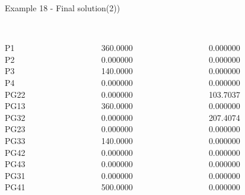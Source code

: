 \begin{frame}{Example 18 - Final solution(2))}

\begin{columns}[t]
\begin{column}{0.3\textwidth}
\\

P1\\
P2\\
P3\\
P4\\
PG22\\
PG13\\
PG32\\
PG23\\
PG33\\
PG42\\
PG43\\
PG31\\
PG41\\
\end{column}
\begin{column}{0.3\textwidth}
\\

360.0000\\
0.000000\\
140.0000\\
0.000000\\
0.000000\\
360.0000\\
0.000000\\
0.000000\\
140.0000\\
0.000000\\
0.000000\\
0.000000\\
500.0000\\
\end{column}  

\begin{column}{0.3\textwidth}
\\
0.000000\\
0.000000\\
0.000000\\
0.000000\\
103.7037\\
0.000000\\
207.4074\\
0.000000\\
0.000000\\
0.000000\\
0.000000\\
0.000000\\
0.000000\\
\end{column}
\end{columns}
\end{frame}


